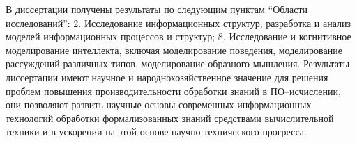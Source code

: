\documentclass[a4paper]{report}
\begin{document}
В диссертации получены результаты по следующим пунктам ``Области исследований'': 2. Исследование информационных структур, разработка и анализ моделей информационных процессов и структур; 8. Исследование и когнитивное моделирование интеллекта, включая моделирование поведения, моделирование рассуждений различных типов, моделирование образного мышления. Результаты диссертации имеют научное и народнохозяйственное значение для решения проблем повышения производительности обработки знаний в ПО--исчислении, они позволяют развить научные основы современных информационных технологий обработки формализованных знаний средствами вычислительной техники и в ускорении на этой основе научно-технического прогресса.



\end{document}
